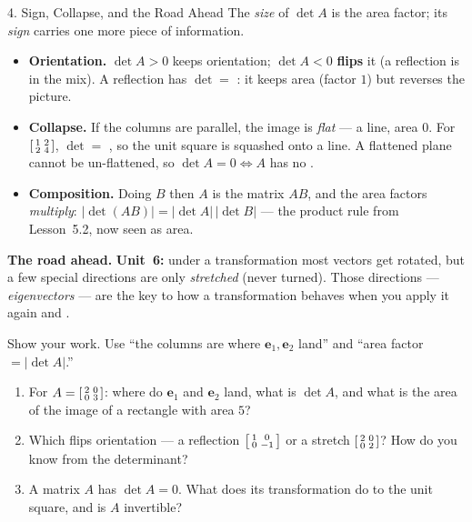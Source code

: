\documentclass[10pt]{article}
\newcommand{\ee}{\mathbf{e}}
\begin{document}
\begin{notesbox}{4. Sign, Collapse, and the Road Ahead}
The \emph{size} of $\det A$ is the area factor; its \emph{sign} carries one more piece of information.
\begin{itemize}\setlength{\itemsep}{3pt}
  \item \textbf{Orientation.} $\det A>0$ keeps orientation; $\det A<0$ \textbf{flips} it (a reflection is
        in the mix). A reflection has $\det=$ \blank{1.0cm}: it keeps area (factor $1$) but reverses the picture.
  \item \textbf{Collapse.} If the columns are parallel, the image is \emph{flat} --- a line, area $0$. For
        $\begin{bsmallmatrix} 1 & 2 \\ 2 & 4 \end{bsmallmatrix}$, $\det=$ \blank{1.0cm}, so the unit square
        is squashed onto a line. A flattened plane cannot be un-flattened, so $\det A=0\Leftrightarrow A$ has no \blank{1.6cm}.
  \item \textbf{Composition.} Doing $B$ then $A$ is the matrix $AB$, and the area factors \emph{multiply}:
        $|\det(AB)|=|\det A|\,|\det B|$ --- the product rule from Lesson~5.2, now seen as area.
\end{itemize}
\vspace{2pt}
\textbf{The road ahead.} \textbf{Unit~6:} under a transformation most vectors get rotated, but a few
special directions are only \emph{stretched} (never turned). Those directions --- \emph{eigenvectors} ---
are the key to how a transformation behaves when you apply it again and \blank{1.4cm}.
\end{notesbox}

\begin{practicebox}
Show your work. Use ``the columns are where $\ee_1,\ee_2$ land'' and ``area factor $=|\det A|$.''
\begin{enumerate}[leftmargin=1.6em, itemsep=6pt]
  \item For $A=\begin{bsmallmatrix} 2 & 0 \\ 0 & 3 \end{bsmallmatrix}$: where do $\ee_1$ and $\ee_2$ land, what is $\det A$, and what is the area of the image of a rectangle with area $5$? \writeline
  \item Which flips orientation --- a reflection $\begin{bsmallmatrix} 1 & 0 \\ 0 & -1 \end{bsmallmatrix}$ or a stretch $\begin{bsmallmatrix} 2 & 0 \\ 0 & 2 \end{bsmallmatrix}$? How do you know from the determinant? \writeline
  \item A matrix $A$ has $\det A=0$. What does its transformation do to the unit square, and is $A$ invertible? \writeline
\end{enumerate}
\end{practicebox}
\end{document}
